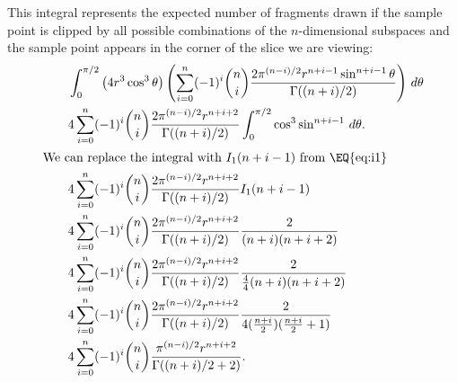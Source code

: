 \begin{lem}

This integral represents the expected number of fragments drawn if the sample
point is clipped by all possible combinations of the $n$-dimensional 
subspaces and the sample point appears in the corner of the slice we are 
viewing:
\begin{align*}
  \qquad & \int_{0}^{\pi/2}
           \left(4r^3 \cos^3 \theta\right)
           \left(\sum_{i=0}^{n} 
           (-1)^i {n \choose i}
           \frac{2\pi^{(n-i)/2} r^{n+i-1} \sin^{n+i-1} \theta}
                {\Gamma((n+i)/2)} \right) \, d\theta \\
  \qquad & 4 \sum_{i=0}^{n} (-1)^i {n \choose i} 
                            \frac{2\pi^{(n-i)/2} r^{n+i+2}}
                                 {\Gamma((n+i)/2)}
           \int_{0}^{\pi/2} \cos^3 \sin^{n+i-1} \, d\theta \text{.} \\
\intertext{We can replace the integral with $I_1(n+i-1)$ from \EQ{eq:i1}}
  \qquad & 4 \sum_{i=0}^{n} (-1)^i {n \choose i}
                            \frac{2\pi^{(n-i)/2} r^{n+i+2}}
                                 {\Gamma((n+i)/2)}
                            I_1(n+i-1) \\
  \qquad & 4 \sum_{i=0}^{n} (-1)^i {n \choose i} 
                            \frac{2\pi^{(n-i)/2} r^{n+i+2}}{\Gamma((n+i)/2)}
                            \frac{2}{(n+i)(n+i+2)} \\
  \qquad & 4 \sum_{i=0}^{n} (-1)^i {n \choose i} 
                            \frac{2\pi^{(n-i)/2} r^{n+i+2}}{\Gamma((n+i)/2)}
                            \frac{2}{\frac{4}{4}(n+i)(n+i+2)} \\
  \qquad & 4 \sum_{i=0}^{n} (-1)^i {n \choose i} 
                            \frac{2\pi^{(n-i)/2} r^{n+i+2}}{\Gamma((n+i)/2)}
                            \frac{2}{4(\frac{n+i}{2})(\frac{n+i}{2}+1)} \\
  \qquad & 4 \sum_{i=0}^{n} (-1)^i {n \choose i} 
                            \frac{\pi^{(n-i)/2} r^{n+i+2}}{\Gamma((n+i)/2 + 2)}
\text{.}
\end{align*}

\end{lem}

